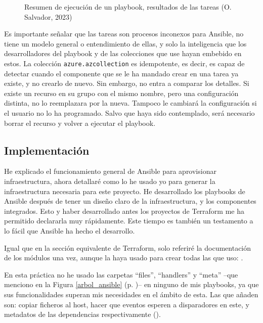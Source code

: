 \documentclass[11pt]{article}
\begin{document}
\begin{flushleft}
        \skip
        \begin{figure}[htb]
			\centering
			\caption{Resumen de ejecución de un playbook, resultados de las tareas (O. Salvador, 2023)}
		\end{figure}
        \skip
        
        
    Es importante señalar que las tareas son procesos inconexos para Ansible, no tiene un modelo general o entendimiento de ellas, y solo la inteligencia que los desarrolladores del playbook y de las colecciones que use hayan embebido en estos. La colección \texttt{azure.azcollection} es idempotente, es decir, es capaz de detectar cuando el componente que se le ha mandado crear en una tarea ya existe, y no crearlo de nuevo. Sin embargo, no entra a comparar los detalles. Si existe un recurso en su grupo con el mismo nombre, pero una configuración distinta, no lo reemplazara por la nueva. Tampoco le cambiará la configuración si el usuario no lo ha programado. Salvo que haya sido contemplado, será necesario borrar el recurso y volver a ejecutar el playbook.
    \linebreak




    \clearpage
    \subsection{Implementación}
    He explicado el funcionamiento general de Ansible para aprovisionar infraestructura, ahora detallaré como lo he usado yo para generar la infraestructura necesaria para este proyecto. He desarrollado los playbooks de Ansible después de tener un diseño claro de la infraestructura, y los componentes integrados. Esto y haber desarrollado antes los proyectos de Terraform me ha permitido declararla muy rápidamente. Este tiempo es también un testamento a lo fácil que Ansible ha hecho el desarrollo. 
    \linebreak
    
    Igual que en la sección equivalente de Terraform, solo referiré la documentación de los módulos una vez, aunque la haya usado para crear todas las que uso: \cite{ansible_collection}.
    \linebreak
    
    En esta práctica no he usado las carpetas ``files'', ``handlers'' y ``meta'' --que menciono en la Figura \ref{arbol_ansible} (p. \pageref{arbol_ansible})-- en ninguno de mis playbooks, ya que sus funcionalidades superan mis necesidades en el ámbito de esta. Las que añaden son: copiar ficheros al host, hacer que eventos esperen a disparadores en este, y metadatos de las dependencias respectivamente (\cite{ansible_folders}).
    \linebreak
    

\end{flushleft}
\end{document}
